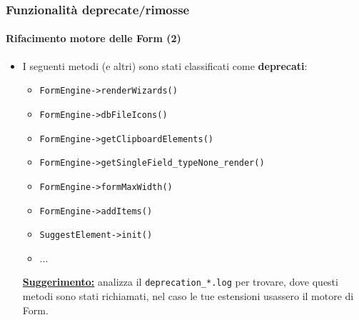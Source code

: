 \begin{frame}[fragile]
	\frametitle{Funzionalità deprecate/rimosse}
	\framesubtitle{Rifacimento motore delle Form (2)}

	\begin{itemize}

		\item I seguenti metodi (e altri) sono stati classificati come \textbf{deprecati}:

			\begin{itemize}
				\item \texttt{FormEngine->renderWizards()}
				\item \texttt{FormEngine->dbFileIcons()}
				\item \texttt{FormEngine->getClipboardElements()}
				\item \texttt{FormEngine->getSingleField\_typeNone\_render()}
				\item \texttt{FormEngine->formMaxWidth()}
				\item \texttt{FormEngine->addItems()}
				\item \texttt{SuggestElement->init()}
				\item ...
			\end{itemize}

		\small
			\underline{\textbf{Suggerimento:}}
			analizza il \texttt{deprecation\_*.log} per trovare, dove questi metodi
			sono stati richiamati, nel caso le tue estensioni usassero il motore di Form.
		\normalsize

	\end{itemize}

\end{frame}


